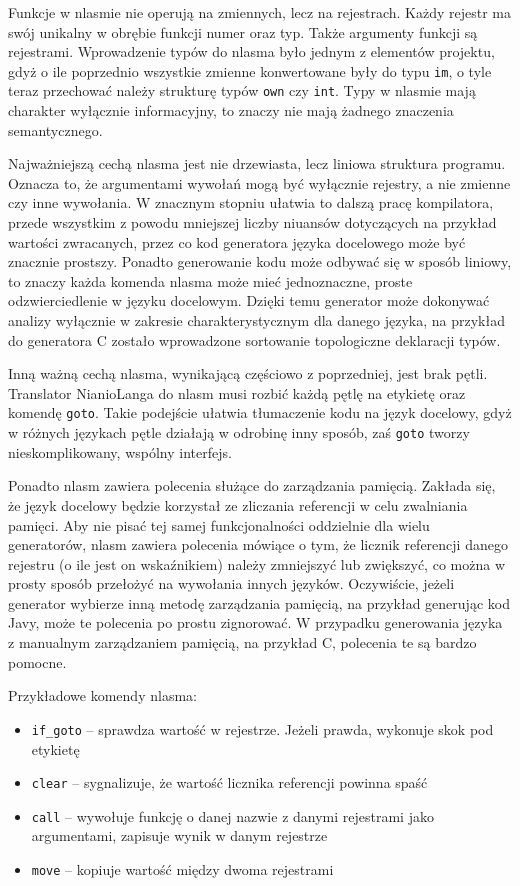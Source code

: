 \documentclass[licencjacka]{pracamgr}
\begin{document}
Funkcje w nlasmie nie operują na zmiennych, lecz na rejestrach. Każdy rejestr ma swój unikalny w obrębie funkcji numer oraz typ. Także argumenty
funkcji są rejestrami. Wprowadzenie typów do nlasma było jednym z elementów projektu, gdyż o ile poprzednio wszystkie zmienne konwertowane były do
typu \texttt{im}, o tyle teraz przechować należy strukturę typów \texttt{own} czy \texttt{int}. Typy w nlasmie mają charakter wyłącznie informacyjny,
to znaczy nie mają żadnego znaczenia semantycznego.

Najważniejszą cechą nlasma jest nie drzewiasta, lecz liniowa struktura programu. Oznacza to, że argumentami wywołań mogą być wyłącznie rejestry, a nie
zmienne czy inne wywołania. W znacznym stopniu ułatwia to dalszą pracę kompilatora, przede wszystkim z powodu mniejszej liczby niuansów dotyczących na
przykład wartości zwracanych, przez co kod generatora języka docelowego może być znacznie prostszy. Ponadto generowanie kodu może odbywać się w sposób
liniowy, to znaczy każda komenda nlasma może mieć jednoznaczne, proste odzwierciedlenie w języku docelowym. Dzięki temu generator może dokonywać
analizy wyłącznie w zakresie charakterystycznym dla danego języka, na przykład do generatora C zostało wprowadzone sortowanie topologiczne deklaracji
typów.

Inną ważną cechą nlasma, wynikającą częściowo z poprzedniej, jest brak pętli. Translator NianioLanga do nlasm musi rozbić każdą pętlę na etykietę oraz
komendę \texttt{goto}. Takie podejście ułatwia tłumaczenie kodu na język docelowy, gdyż w różnych językach pętle działają w odrobinę inny sposób, zaś
\texttt{goto} tworzy nieskomplikowany, wspólny interfejs.

Ponadto nlasm zawiera polecenia służące do zarządzania pamięcią. Zakłada się, że język docelowy będzie korzystał ze zliczania referencji w celu
zwalniania pamięci. Aby nie pisać tej samej funkcjonalności oddzielnie dla wielu generatorów, nlasm zawiera polecenia mówiące o tym, że licznik
referencji danego rejestru (o ile jest on wskaźnikiem) należy zmniejszyć lub zwiększyć, co można w prosty sposób przełożyć na wywołania innych
języków. Oczywiście, jeżeli generator wybierze inną metodę zarządzania pamięcią, na przykład generując kod Javy, może te polecenia po prostu
zignorować. W przypadku generowania języka z manualnym zarządzaniem pamięcią, na przykład C, polecenia te są bardzo pomocne.


Przykładowe komendy nlasma:
\begin{itemize}
\item \texttt{if\_goto} -- sprawdza wartość w rejestrze. Jeżeli prawda, wykonuje skok pod etykietę
\item \texttt{clear} -- sygnalizuje, że wartość licznika referencji powinna spaść
\item \texttt{call} -- wywołuje funkcję o danej nazwie z danymi rejestrami jako argumentami, zapisuje wynik w danym rejestrze
\item \texttt{move} -- kopiuje wartość między dwoma rejestrami
\end{itemize}
\end{document}
